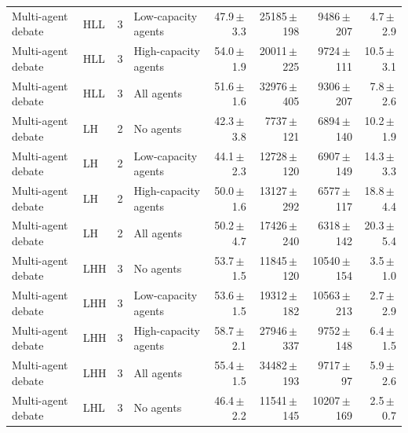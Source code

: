 \begin{table}[htbp]
\begin{tabular}{llclrrrr}
Multi-agent debate & HLL & 3 & Low-capacity agents & 47.9{\scriptsize\,$\pm$\,3.3} & 25185{\scriptsize\,$\pm$\,198} & 9486{\scriptsize\,$\pm$\,207} & 4.7{\scriptsize\,$\pm$\,2.9} \\
Multi-agent debate & HLL & 3 & High-capacity agents & 54.0{\scriptsize\,$\pm$\,1.9} & 20011{\scriptsize\,$\pm$\,225} & 9724{\scriptsize\,$\pm$\,111} & 10.5{\scriptsize\,$\pm$\,3.1} \\
Multi-agent debate & HLL & 3 & All agents & 51.6{\scriptsize\,$\pm$\,1.6} & 32976{\scriptsize\,$\pm$\,405} & 9306{\scriptsize\,$\pm$\,207} & 7.8{\scriptsize\,$\pm$\,2.6} \\
Multi-agent debate & LH & 2 & No agents & 42.3{\scriptsize\,$\pm$\,3.8} & 7737{\scriptsize\,$\pm$\,121} & 6894{\scriptsize\,$\pm$\,140} & 10.2{\scriptsize\,$\pm$\,1.9} \\
Multi-agent debate & LH & 2 & Low-capacity agents & 44.1{\scriptsize\,$\pm$\,2.3} & 12728{\scriptsize\,$\pm$\,120} & 6907{\scriptsize\,$\pm$\,149} & 14.3{\scriptsize\,$\pm$\,3.3} \\
Multi-agent debate & LH & 2 & High-capacity agents & 50.0{\scriptsize\,$\pm$\,1.6} & 13127{\scriptsize\,$\pm$\,292} & 6577{\scriptsize\,$\pm$\,117} & 18.8{\scriptsize\,$\pm$\,4.4} \\
Multi-agent debate & LH & 2 & All agents & 50.2{\scriptsize\,$\pm$\,4.7} & 17426{\scriptsize\,$\pm$\,240} & 6318{\scriptsize\,$\pm$\,142} & 20.3{\scriptsize\,$\pm$\,5.4} \\
Multi-agent debate & LHH & 3 & No agents & 53.7{\scriptsize\,$\pm$\,1.5} & 11845{\scriptsize\,$\pm$\,120} & 10540{\scriptsize\,$\pm$\,154} & 3.5{\scriptsize\,$\pm$\,1.0} \\
Multi-agent debate & LHH & 3 & Low-capacity agents & 53.6{\scriptsize\,$\pm$\,1.5} & 19312{\scriptsize\,$\pm$\,182} & 10563{\scriptsize\,$\pm$\,213} & 2.7{\scriptsize\,$\pm$\,2.9} \\
Multi-agent debate & LHH & 3 & High-capacity agents & 58.7{\scriptsize\,$\pm$\,2.1} & 27946{\scriptsize\,$\pm$\,337} & 9752{\scriptsize\,$\pm$\,148} & 6.4{\scriptsize\,$\pm$\,1.5} \\
Multi-agent debate & LHH & 3 & All agents & 55.4{\scriptsize\,$\pm$\,1.5} & 34482{\scriptsize\,$\pm$\,193} & 9717{\scriptsize\,$\pm$\,97} & 5.9{\scriptsize\,$\pm$\,2.6} \\
Multi-agent debate & LHL & 3 & No agents & 46.4{\scriptsize\,$\pm$\,2.2} & 11541{\scriptsize\,$\pm$\,145} & 10207{\scriptsize\,$\pm$\,169} & 2.5{\scriptsize\,$\pm$\,0.7} \\

\end{tabular}
\end{table}

